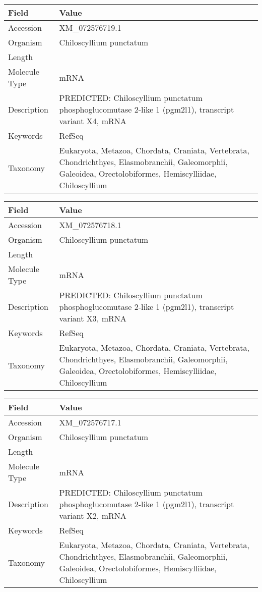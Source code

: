 \documentclass[10pt]{article}
\begin{document}
{\footnotesize
\begin{longtable}{>{\raggedright\arraybackslash}p{4.5cm} >{\raggedright\arraybackslash}p{11.5cm}}
\textbf{Field} & \textbf{Value} \\
\hline
Accession & XM\_072576719.1 \\
Organism & Chiloscyllium punctatum \\
Length & 5655 \\
Molecule Type & mRNA \\
Description & PREDICTED: Chiloscyllium punctatum phosphoglucomutase 2-like 1 (pgm2l1), transcript variant X4, mRNA \\
Keywords & RefSeq \\
Taxonomy & Eukaryota, Metazoa, Chordata, Craniata, Vertebrata, Chondrichthyes, Elasmobranchii, Galeomorphii, Galeoidea, Orectolobiformes, Hemiscylliidae, Chiloscyllium \\
\end{longtable}
}

{\footnotesize
\begin{longtable}{>{\raggedright\arraybackslash}p{4.5cm} >{\raggedright\arraybackslash}p{11.5cm}}
\textbf{Field} & \textbf{Value} \\
\hline
Accession & XM\_072576718.1 \\
Organism & Chiloscyllium punctatum \\
Length & 5733 \\
Molecule Type & mRNA \\
Description & PREDICTED: Chiloscyllium punctatum phosphoglucomutase 2-like 1 (pgm2l1), transcript variant X3, mRNA \\
Keywords & RefSeq \\
Taxonomy & Eukaryota, Metazoa, Chordata, Craniata, Vertebrata, Chondrichthyes, Elasmobranchii, Galeomorphii, Galeoidea, Orectolobiformes, Hemiscylliidae, Chiloscyllium \\
\end{longtable}
}

{\footnotesize
\begin{longtable}{>{\raggedright\arraybackslash}p{4.5cm} >{\raggedright\arraybackslash}p{11.5cm}}
\textbf{Field} & \textbf{Value} \\
\hline
Accession & XM\_072576717.1 \\
Organism & Chiloscyllium punctatum \\
Length & 5940 \\
Molecule Type & mRNA \\
Description & PREDICTED: Chiloscyllium punctatum phosphoglucomutase 2-like 1 (pgm2l1), transcript variant X2, mRNA \\
Keywords & RefSeq \\
Taxonomy & Eukaryota, Metazoa, Chordata, Craniata, Vertebrata, Chondrichthyes, Elasmobranchii, Galeomorphii, Galeoidea, Orectolobiformes, Hemiscylliidae, Chiloscyllium \\
\end{longtable}
}
\end{document}
